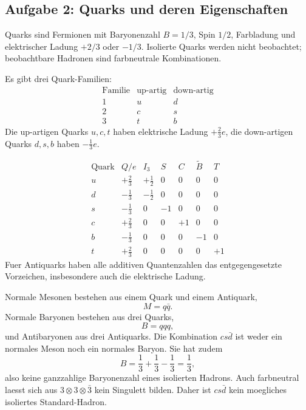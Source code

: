 \documentclass[11pt,a4paper]{scrartcl}
\begin{document}
\subsection{Aufgabe 2: Quarks und deren Eigenschaften}
\begin{learningbox}
Quarks sind Fermionen mit Baryonenzahl \(B=1/3\), Spin \(1/2\), Farbladung und elektrischer Ladung \(+2/3\) oder \(-1/3\). Isolierte Quarks werden nicht beobachtet; beobachtbare Hadronen sind farbneutrale Kombinationen.
\end{learningbox}

\begin{calculationbox}[title={(a) Quark-Familien}]
Es gibt drei Quark-Familien:
\[
\begin{array}{c|c|c}
\text{Familie} & \text{up-artig} & \text{down-artig}\\\hline
1 & u & d\\
2 & c & s\\
3 & t & b
\end{array}
\]
Die up-artigen Quarks \(u,c,t\) haben elektrische Ladung \(+\frac23 e\), die down-artigen Quarks \(d,s,b\) haben \(-\frac13 e\).
\end{calculationbox}

\begin{calculationbox}[title={(b) Flavour-Quantenzahlen und Ladungen}]
\[
\begin{array}{c|c|c|c|c|c|c}
\text{Quark} & Q/e & I_3 & S & C & \tilde B & T\\\hline
u & +\frac23 & +\frac12 & 0 & 0 & 0 & 0\\
d & -\frac13 & -\frac12 & 0 & 0 & 0 & 0\\
s & -\frac13 & 0 & -1 & 0 & 0 & 0\\
c & +\frac23 & 0 & 0 & +1 & 0 & 0\\
b & -\frac13 & 0 & 0 & 0 & -1 & 0\\
t & +\frac23 & 0 & 0 & 0 & 0 & +1
\end{array}
\]
Fuer Antiquarks haben alle additiven Quantenzahlen das entgegengesetzte Vorzeichen, insbesondere auch die elektrische Ladung.
\end{calculationbox}

\begin{calculationbox}[title={(c) Mesonen und Baryonen}]
Normale Mesonen bestehen aus einem Quark und einem Antiquark,
\[
M=q\bar q.
\]
Normale Baryonen bestehen aus drei Quarks,
\[
B=qqq,
\]
und Antibaryonen aus drei Antiquarks. Die Kombination \(cs\bar d\) ist weder ein normales Meson noch ein normales Baryon. Sie hat zudem
\[
B=\frac13+\frac13-\frac13=\frac13,
\]
also keine ganzzahlige Baryonenzahl eines isolierten Hadrons. Auch farbneutral laesst sich aus \(3\otimes3\otimes\bar 3\) kein Singulett bilden. Daher ist \(cs\bar d\) kein moegliches isoliertes Standard-Hadron.
\end{calculationbox}
\end{document}
